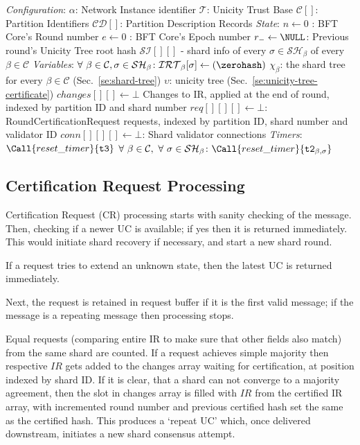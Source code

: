 \begin{algorithm}
  \caption{Global Parameters and Variables}\label{alg:globals}
  \begin{algorithmic}[0]
    \State \emph{Configuration}:
    \State $\alpha$: Network Instance identifier
    \State $\mathcal{T}$: Unicity Trust Base
    \State $\mathcal{C}[]$: Partition Identifiers
    \State $\mathcal{CD}[]$: Partition Description Records
    \State \emph{State}:
    \State $n \gets 0$ : BFT Core's Round number
    \State $e \gets 0$ : BFT Core's Epoch number
    \State $r_- \gets \NULL$: Previous round's Unicity Tree root hash
    \State $\mathcal{SI}[][]$ - shard info of every $\sigma\in\mathcal{SH}_\beta$ of every $\beta\in\mathcal{C}$
    \State \emph{Variables}:
    \State $\forall \ \beta\in\mathcal{C}, \sigma\in\mathcal{SH}_\beta \colon \mathcal{IRT}_\beta[\sigma] \gets (\zerohash)$
    \State $\chi_\beta$: the shard tree for every $\beta\in\mathcal{C}$  (Sec.~\ref{se:shard-tree})
    \State $\upsilon$: unicity tree (Sec.~\ref{se:unicity-tree-certificate})
    \State $changes[][] \gets \bot$ Changes to IR, applied at the end of round, indexed by partition ID and shard number
    \State $req[][][] \gets \bot$: RoundCertificationRequest requests, indexed by partition ID, shard number and validator ID
    \State $conn[][][] \gets \bot$: Shard validator connections
    \State \emph{Timers}:
    \State $\Call{reset\_timer}{\texttt{t3}}$
    \State $\forall \ \beta\in\mathcal{C}, \ \forall \ \sigma\in\mathcal{SH}_\beta \colon  \Call{reset\_timer}{\texttt{t2}_{\beta, \sigma}}$
  \end{algorithmic}
\end{algorithm}


\subsection{Certification Request Processing}


Certification Request (CR) processing starts with sanity checking of the message. Then, checking if a newer UC is available; if yes then it is returned immediately. This would initiate shard recovery if necessary, and start a new shard round.

If a request tries to extend an unknown state, then the latest UC is returned immediately.

Next, the request is retained in request buffer if it is the first valid message; if the message is a repeating message then processing stops.

Equal requests (comparing entire IR to make sure that other fields also match) from the same shard are counted. If a request achieves simple majority then respective $IR$ gets added to the changes array waiting for certification, at position indexed by shard ID. If it is clear, that a shard can not converge to a majority agreement, then the slot in changes array is filled with $IR$ from the certified IR array, with incremented round number and previous certified hash set the same as the certified hash. This produces a `repeat UC' which, once delivered downstream, initiates a new shard consensus attempt.

